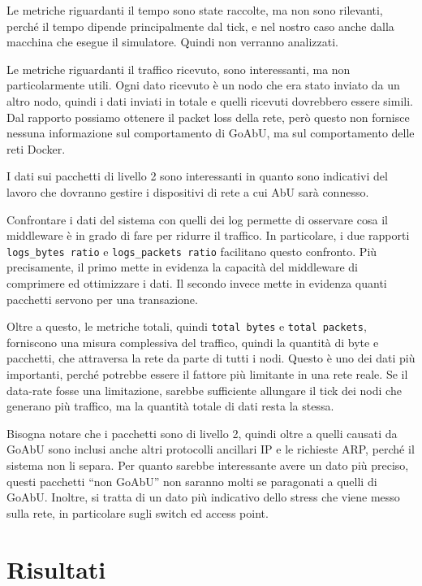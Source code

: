 \documentclass[12pt, a4paper]{article}
\begin{document}
Le metriche riguardanti il tempo sono state raccolte, ma non sono rilevanti, perché il tempo dipende principalmente dal tick, e nel nostro caso anche dalla macchina che esegue il simulatore. Quindi non verranno analizzati.

Le metriche riguardanti il traffico ricevuto, sono interessanti, ma non particolarmente utili. Ogni dato ricevuto è un nodo che era stato inviato da un altro nodo, quindi i dati inviati in totale e quelli ricevuti dovrebbero essere simili.
Dal rapporto possiamo ottenere il packet loss della rete, però questo non fornisce nessuna informazione sul comportamento di GoAbU, ma sul comportamento delle reti Docker.

I dati sui pacchetti di livello 2 sono interessanti in quanto sono indicativi del lavoro che dovranno gestire i dispositivi di rete a cui AbU sarà connesso.

Confrontare i dati del sistema con quelli dei log permette di osservare cosa il middleware è in grado di fare per ridurre il traffico. In particolare, i due rapporti \lstinline{logs_bytes ratio} e \lstinline{logs_packets ratio} facilitano questo confronto.
Più precisamente, il primo mette in evidenza la capacità del middleware di comprimere ed ottimizzare i dati.
Il secondo invece mette in evidenza quanti pacchetti servono per una transazione.

Oltre a questo, le metriche totali, quindi \lstinline{total bytes} e \lstinline{total packets}, forniscono una misura complessiva del traffico, quindi la quantità di byte e pacchetti, che attraversa la rete da parte di tutti i nodi.
Questo è uno dei dati più importanti, perché potrebbe essere il fattore più limitante in una rete reale. Se il data-rate fosse una limitazione, sarebbe sufficiente allungare il tick dei nodi che generano più traffico, ma la quantità totale di dati resta la stessa.

Bisogna notare che i pacchetti sono di livello 2, quindi oltre a quelli causati da GoAbU sono inclusi anche altri protocolli ancillari IP e le richieste ARP, perché il sistema non li separa.
Per quanto sarebbe interessante avere un dato più preciso, questi pacchetti ``non GoAbU'' non saranno molti se paragonati a quelli di GoAbU. Inoltre, si tratta di un dato più indicativo dello stress che viene messo sulla rete, in particolare sugli switch ed access point.

\newpage

\section{Risultati}
\end{document}
